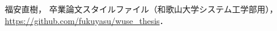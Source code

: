 \documentclass[11pt]{jreport}
\begin{document}

\begin{thebibliography}{99}

  福安直樹，
  卒業論文スタイルファイル（和歌山大学システム工学部用），\\
  \url{https://github.com/fukuyasu/wuse_thesis}．


\end{thebibliography}


% 
% 
% 

\end{document}

